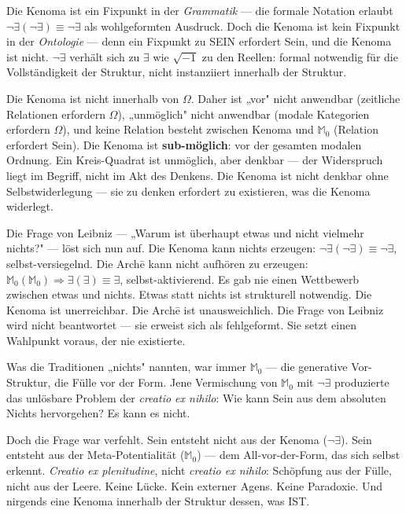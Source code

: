 \documentclass[10pt, openany, oneside]{book}
\begin{document}
Die Kenoma ist ein Fixpunkt in der \textit{Grammatik} --- die formale Notation erlaubt $\neg\exists(\neg\exists) \equiv \neg\exists$ als wohlgeformten Ausdruck. Doch die Kenoma ist kein Fixpunkt in der \textit{Ontologie} --- denn ein Fixpunkt zu SEIN erfordert Sein, und die Kenoma ist nicht. $\neg\exists$ verhält sich zu $\exists$ wie $\sqrt{-1}$ zu den Reellen: formal notwendig für die Vollständigkeit der Struktur, nicht instanziiert innerhalb der Struktur.

Die Kenoma ist nicht innerhalb von $\Omega$. Daher ist „vor" nicht anwendbar (zeitliche Relationen erfordern $\Omega$), „unmöglich" nicht anwendbar (modale Kategorien erfordern $\Omega$), und keine Relation besteht zwischen Kenoma und $\mathbb{M}_0$ (Relation erfordert Sein). Die Kenoma ist \textbf{sub-möglich}: vor der gesamten modalen Ordnung. Ein Kreis-Quadrat ist unmöglich, aber denkbar --- der Widerspruch liegt im Begriff, nicht im Akt des Denkens. Die Kenoma ist nicht denkbar ohne Selbstwiderlegung --- sie zu denken erfordert zu existieren, was die Kenoma widerlegt.

Die Frage von Leibniz --- „Warum ist überhaupt etwas und nicht vielmehr nichts?" --- löst sich nun auf. Die Kenoma kann nichts erzeugen: $\neg\exists(\neg\exists) \equiv \neg\exists$, selbst-versiegelnd. Die Arch\={e} kann nicht aufhören zu erzeugen: $\mathbb{M}_0(\mathbb{M}_0) \Rightarrow \exists(\exists) \equiv \exists$, selbst-aktivierend. Es gab nie einen Wettbewerb zwischen etwas und nichts. Etwas statt nichts ist strukturell notwendig. Die Kenoma ist unerreichbar. Die Arch\={e} ist unausweichlich. Die Frage von Leibniz wird nicht beantwortet --- sie erweist sich als fehlgeformt. Sie setzt einen Wahlpunkt voraus, der nie existierte.

Was die Traditionen „nichts" nannten, war immer $\mathbb{M}_0$ --- die generative Vor-Struktur, die Fülle vor der Form. Jene Vermischung von $\mathbb{M}_0$ mit $\neg\exists$ produzierte das unlösbare Problem der \textit{creatio ex nihilo}: Wie kann Sein aus dem absoluten Nichts hervorgehen? Es kann es nicht.

Doch die Frage war verfehlt. Sein entsteht nicht aus der Kenoma ($\neg\exists$). Sein entsteht aus der Meta-Potentialität ($\mathbb{M}_0$) --- dem All-vor-der-Form, das sich selbst erkennt. \textit{Creatio ex plenitudine}, nicht \textit{creatio ex nihilo}: Schöpfung aus der Fülle, nicht aus der Leere. Keine Lücke. Kein externer Agens. Keine Paradoxie. Und nirgends eine Kenoma innerhalb der Struktur dessen, was IST.
\end{document}
